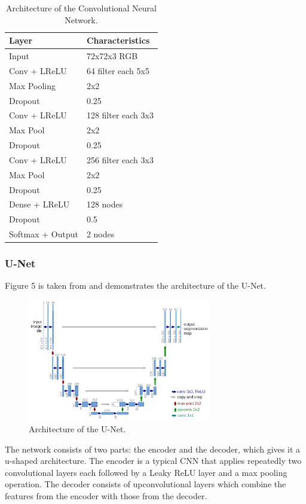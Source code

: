 \documentclass[10pt,conference,compsocconf]{IEEEtran}
\begin{document}
\begin{table}[htbp]
	\centering
	\begin{tabular}[c]{|l||l|}
		\hline
		\textbf{Layer}&\textbf{Characteristics}\\
		\hline
		Input&72x72x3 RGB\\
		Conv + LReLU &64 filter each 5x5\\
		Max Pooling&2x2\\		
		Dropout&0.25\\
		\hline
		Conv + LReLU &128 filter each 3x3\\
		Max Pool&2x2\\		
		Dropout&0.25\\
		\hline
		Conv + LReLU &256 filter each 3x3\\
		Max Pool&2x2\\		
		Dropout&0.25\\
		\hline
		Dense + LReLU &128 nodes\\
		Dropout&0.5\\		
		Softmax + Output&2 nodes\\
		\hline
	\end{tabular}
	\caption{Architecture of the Convolutional Neural Network.}
	\label{tab:cnn_architecture}
\end{table}


\subsubsection{U-Net}

Figure 5 is taken from \cite{unet} and demonstrates the architecture of the U-Net. 
\begin{figure}[htbp]
	\centering
	\includegraphics[width=8cm]{images/unet.png}
	\caption{Architecture of the U-Net.}
	\label{fig:unet}
\end{figure}

The network consists of two parts: the encoder and the decoder, which gives it a u-shaped architecture. The encoder is a typical CNN that applies repeatedly two convolutional layers each followed by a Leaky ReLU layer and a max pooling operation.
The decoder consists of upconvolutional layers which combine the features from the encoder with those from the decoder.
\end{document}
